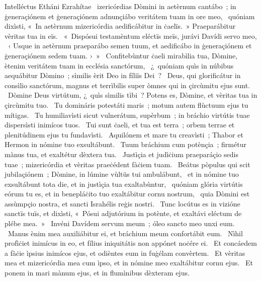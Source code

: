{ Intelléctus Etháni Ezrahítae}
{%
~izericórdias Dòmini in aetèrnum cantábo~; in ġeneraçiónem et ġeneraçiónem adnunçiábo veritátem tuam in ore meo, 
~quóniam dixìsti, «~In aetèrnum mizericórdia aedificábitur in ċaelïs.~» Praeparábitur vèritas tua in eïs. 
~«~Dispósui testamèntum eléctïs meïs, jurávi Davídi servo meo, 
~‹ Usque in aetèrnum praeparábo semen tuum, et aedificábo in ġeneraçiónem et ġeneraçiónem sedem tuam. ›~»
~Confitebùntur ċaeli mirabìlia tua, Dòmine, ètenim veritátem tuam in ecclésia sanctórum, 
~¿~quóniam quìs in núbibus aequábitur Dòmino~; sìmilis èrit Deo in fíliïs Dei~? 
~Deus, qui glorificátur in consìlio sanctórum, magnus et terrìbilis super òmnes qui in çircùmitu ejus sunt. 
~Dòmine Deus virtútum, ¿~quìs sìmilis tìbi~? Potens es, Dòmine, et vèritas tua in çircùmitu tuo. 
~Tu domináris potestáti maris~; motum autem flùctuum ejus tu mítigas. 
~Tu humiliavìsti sicut vulnerátum, supèrbum~; in bráchio virtútis tuae dispersìsti inimícos tuos. 
~Tui sunt ċaeli, et tua est terra~; orbem terrae et plenitúdinem ejus tu fundavìsti. 
~Aquilónem et mare tu creavìsti~; Thabor et Hermon in nómine tuo exsultábunt. 
~Tuum bráchium cum potènçia~; firmétur mànus tua, et exaltétur dèxtera tua. 
~Justìçia et judìċium praeparáçio sedis tuae~; mizericórdia et vèritas praeċédent fàċiem tuam. 
~Beátus pòpulus qui scit jubilaçiónem~; Dòmine, in lúmine vùltüs tui ambulábunt, 
~et in nómine tuo exsultábunt tota die, et in justìçia tua exaltabùntur, 
~quóniam glória virtútis eórum tu es, et in benepláċito tuo exaltábitur cornu nostrum, 
~quia Dòmini est assùmpçio nostra, et sancti Israhélis reġis nostri. 
~Tunc locútus es in vizióne sanctïs tuïs, et dixìsti, «~Pósui adjutórium in potènte, et exaltávi eléctum de plébe mea.~» 
~Invéni Davídem servum meum~; óleo sancto meo unxi eum. 
~Manus ènim mea auxiliábitur ei, et bráchium meum confortábit eum. 
~Nìhil profìċiet inimícus in eo, et fílius iniquitátis non appónet noċére ei. 
~Et concáedem a fàċie ìpsius inimícos ejus, et odièntes eum in fuġélam convèrtem. 
~Et vèritas mea et mizericórdia mea cum ìpso, et in nómine meo exaltábitur cornu ejus. 
~Et ponem in mari mànum ejus, et in flumìnibus dèxteram ejus. 
}
